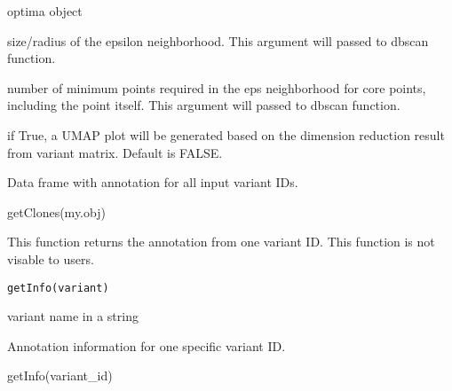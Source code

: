 \documentclass[a4paper]{book}
\begin{document}
%
\begin{Arguments}
\begin{ldescription}
\item[\code{optima.obj}] optima object

\item[\code{eps}] size/radius of the epsilon neighborhood.
This argument will passed to dbscan function.

\item[\code{minPts}] number of minimum points required in the eps neighborhood
for core points, including the point itself.
This argument will passed to dbscan function.

\item[\code{plot}] if True, a UMAP plot will be generated based on the dimension reduction
result from variant matrix.
Default is FALSE.
\end{ldescription}
\end{Arguments}
%
\begin{Value}
Data frame with annotation for all input variant IDs.
\end{Value}
%
\begin{Examples}
\begin{ExampleCode}
getClones(my.obj)
\end{ExampleCode}
\end{Examples}
%
\begin{Description}\relax
This function returns the annotation from one variant ID. This function is not visable to users.
\end{Description}
%
\begin{Usage}
\begin{verbatim}
getInfo(variant)
\end{verbatim}
\end{Usage}
%
\begin{Arguments}
\begin{ldescription}
\item[\code{variant}] variant name in a string
\end{ldescription}
\end{Arguments}
%
\begin{Value}
Annotation information for one specific variant ID.
\end{Value}
%
\begin{Examples}
\begin{ExampleCode}
getInfo(variant_id)
\end{ExampleCode}
\end{Examples}
\end{document}
